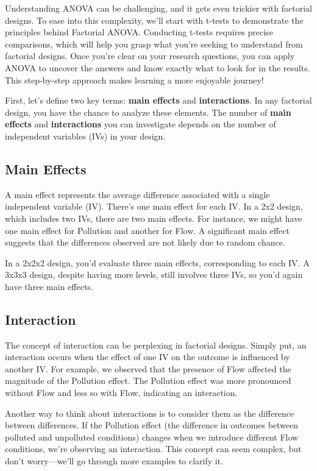 \documentclass[
  letterpaper,
  DIV=11,
  numbers=noendperiod]{scrreprt}
\begin{document}
Understanding ANOVA can be challenging, and it gets even trickier with
factorial designs. To ease into this complexity, we'll start with
t-tests to demonstrate the principles behind Factorial ANOVA. Conducting
t-tests requires precise comparisons, which will help you grasp what
you're seeking to understand from factorial designs. Once you're clear
on your research questions, you can apply ANOVA to uncover the answers
and know exactly what to look for in the results. This step-by-step
approach makes learning a more enjoyable journey!

First, let's define two key terms: \textbf{main effects} and
\textbf{interactions}. In any factorial design, you have the chance to
analyze these elements. The number of \textbf{main effects} and
\textbf{interactions} you can investigate depends on the number of
independent variables (IVs) in your design.

\subsection{Main Effects}\label{main-effects}

A main effect represents the average difference associated with a single
independent variable (IV). There's one main effect for each IV. In a 2x2
design, which includes two IVs, there are two main effects. For
instance, we might have one main effect for Pollution and another for
Flow. A significant main effect suggests that the differences observed
are not likely due to random chance.

In a 2x2x2 design, you'd evaluate three main effects, corresponding to
each IV. A 3x3x3 design, despite having more levels, still involves
three IVs, so you'd again have three main effects.

\subsection{Interaction}\label{interaction}

The concept of interaction can be perplexing in factorial designs.
Simply put, an interaction occurs when the effect of one IV on the
outcome is influenced by another IV. For example, we observed that the
presence of Flow affected the magnitude of the Pollution effect. The
Pollution effect was more pronounced without Flow and less so with Flow,
indicating an interaction.

Another way to think about interactions is to consider them as the
difference between differences. If the Pollution effect (the difference
in outcomes between polluted and unpolluted conditions) changes when we
introduce different Flow conditions, we're observing an interaction.
This concept can seem complex, but don't worry---we'll go through more
examples to clarify it.
\end{document}
